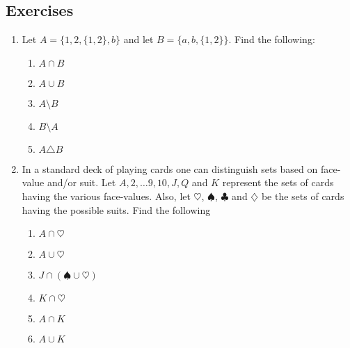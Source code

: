 \documentclass[10pt,]{book}
\theoremstyle{plain}
\theoremstyle{definition}
\theoremstyle{definition}
\numberwithin{equation}{section}
\newcommand{\hint}[1]{ }
\begin{document}
\subsection[{Exercises}]{Exercises}\label{exercises-23}
\leavevmode%
\begin{enumerate}[label=(\alph*)]
\item\hypertarget{li-311}{}
    Let \(A = \{1, 2, \{1, 2\}, b\}\) and let \(B=\{a, b, \{1, 2\} \}\).
    Find the following:

\begin{enumerate}[label=\roman*.]
\item\hypertarget{li-312}{}
          \(A \cap B\)   \hint{ \(\{ b,  \{1, 2\} \}\) }
\item\hypertarget{li-313}{}
          \(A \cup B\) \hint{ \(\{1, 2, a, b, \{1, 2\} \}\) }
\item\hypertarget{li-314}{}
          \(A \setminus B\) \hint{  \(\{ 1, 2 \}\) }
\item\hypertarget{li-315}{}
          \(B \setminus A\) \hint{ \(\{ a \}\) }
\item\hypertarget{li-316}{}
          \(A \triangle B\) \hint{ \(\{ 1, 2, a \}\) }
\end{enumerate}

\item\hypertarget{li-317}{}
    In a standard deck of playing cards one can distinguish sets
    based on face-value and/or suit.  Let \(A, 2, \ldots 9, 10, J, Q\) and \(K\)
    represent the sets of cards having the various face-values.  Also, let
    \(\heartsuit\), \(\spadesuit\), \(\clubsuit\) and \(\diamondsuit\) be the 
    sets of cards having the possible suits.  Find the following

\begin{enumerate}[label=\roman*.]
\item\hypertarget{li-318}{}
          \(A \cap \heartsuit\) \hint{This is just the ace of hearts.}
\item\hypertarget{li-319}{}
          \(A \cup \heartsuit\) \hint{All of the hearts and the other three aces}
\item\hypertarget{li-320}{}
          \(J \cap (\spadesuit \cup \heartsuit)\) \hint{ These two cards are known as the one-eyed jacks.}
\item\hypertarget{li-321}{}
          \(K \cap \heartsuit\) \hint{The king of hearts, a.k.a. the suicide king.}
\item\hypertarget{li-322}{}
          \(A \cap K\) \hint{\(\emptyset\) }
\item\hypertarget{li-323}{}
          \(A \cup K\) \hint{Eight cards: all four kings and all four aces.}
\end{enumerate}


\end{enumerate}
\end{document}

